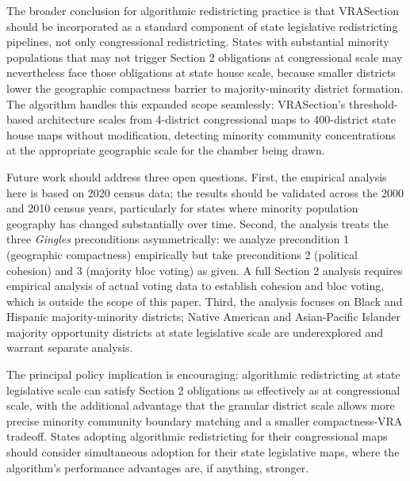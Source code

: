 The broader conclusion for algorithmic redistricting practice is that VRASection should be incorporated as a standard component of state legislative redistricting pipelines, not only congressional redistricting. States with substantial minority populations that may not trigger Section 2 obligations at congressional scale may nevertheless face those obligations at state house scale, because smaller districts lower the geographic compactness barrier to majority-minority district formation. The algorithm handles this expanded scope seamlessly: VRASection's threshold-based architecture scales from 4-district congressional maps to 400-district state house maps without modification, detecting minority community concentrations at the appropriate geographic scale for the chamber being drawn.

Future work should address three open questions. First, the empirical analysis here is based on 2020 census data; the results should be validated across the 2000 and 2010 census years, particularly for states where minority population geography has changed substantially over time. Second, the analysis treats the three \textit{Gingles} preconditions asymmetrically: we analyze precondition 1 (geographic compactness) empirically but take preconditions 2 (political cohesion) and 3 (majority bloc voting) as given. A full Section 2 analysis requires empirical analysis of actual voting data to establish cohesion and bloc voting, which is outside the scope of this paper. Third, the analysis focuses on Black and Hispanic majority-minority districts; Native American and Asian-Pacific Islander majority opportunity districts at state legislative scale are underexplored and warrant separate analysis.

The principal policy implication is encouraging: algorithmic redistricting at state legislative scale can satisfy Section 2 obligations as effectively as at congressional scale, with the additional advantage that the granular district scale allows more precise minority community boundary matching and a smaller compactness-VRA tradeoff. States adopting algorithmic redistricting for their congressional maps should consider simultaneous adoption for their state legislative maps, where the algorithm's performance advantages are, if anything, stronger.
